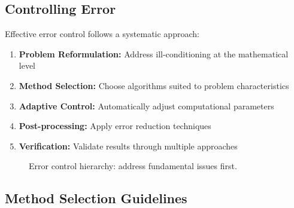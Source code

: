 \subsection{Controlling Error}
\label{sec:practical-strategies}

Effective error control follows a systematic approach:

\begin{enumerate}
    \item \textbf{Problem Reformulation:} Address ill-conditioning at the mathematical level
    \item \textbf{Method Selection:} Choose algorithms suited to problem characteristics
    \item \textbf{Adaptive Control:} Automatically adjust computational parameters
    \item \textbf{Post-processing:} Apply error reduction techniques
    \item \textbf{Verification:} Validate results through multiple approaches
\end{enumerate}

\begin{figure}[htbp]
    \centering
    \caption{Error control hierarchy: address fundamental issues first.}
    \label{fig:error-hierarchy}
\end{figure}

\subsection{Method Selection Guidelines}
\label{subsec:method-selection}

